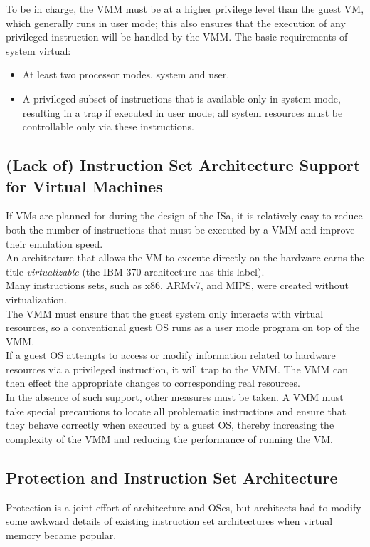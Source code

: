 \documentclass[12pt]{article}
\theoremstyle{definition}
\begin{document}
  To be in charge, the VMM must be at a higher privilege level than the guest VM, which generally runs in user mode;
  this also ensures that the execution of any privileged instruction will be handled by the VMM.
  The basic requirements of system virtual:
  \begin{itemize}
    \item At least two processor modes, system and user.
    \item A privileged subset of instructions that is available only in system mode, resulting in a trap if executed in user mode;
    all system resources must be controllable only via these instructions.
  \end{itemize}

  \subsection{(Lack of) Instruction Set Architecture Support for Virtual Machines}
  If VMs are planned for during the design of the ISa, it is relatively easy to reduce both the number of instructions that must be executed by a VMM and improve their emulation speed. \\
  An architecture that allows the VM to execute directly on the hardware earns the title \emph{virtualizable} (the IBM 370 architecture has this label). \\

  Many instructions sets, such as x86, ARMv7, and MIPS, were created without virtualization. \\

  The VMM must ensure that the guest system only interacts with virtual resources, so a conventional guest OS runs as a user mode program on top of the VMM. \\
  If a guest OS attempts to access or modify information related to hardware resources via a privileged instruction, it will trap to the VMM.
  The VMM can then effect the appropriate changes to corresponding real resources. \\

  In the absence of such support, other measures must be taken.
  A VMM must take special precautions to locate all problematic instructions and ensure that they behave correctly when executed by a guest OS, thereby increasing the complexity of the VMM and reducing the performance of running the VM.

  \subsection{Protection and Instruction Set Architecture}
  Protection is a joint effort of architecture and OSes, but architects had to modify some awkward details of existing instruction set architectures when virtual memory became popular. \\
\end{document}

